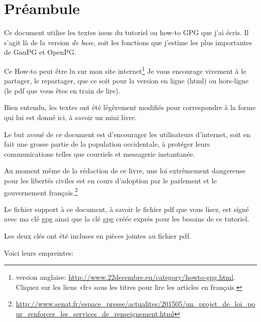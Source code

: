 \documentclass[10pt,a4paper,openany]{book}
\title{\huge\bsc{Des chiffres et des lettres}}
\author{Stéphane \bsc{22Decembre Guedon}}
\date{13 mai 2015}
\begin{document}
	\maketitle

	\chapter{Préambule}
	
	Ce document utilise les textes issus du tutoriel ou how-to GPG que j'ai écris. Il s'agit là de la version \textit{de base}, soit les fonctions que j'estime les plus importantes de GnuPG et OpenPG.
	
	Ce How-to peut être lu sur mon site internet\footnote{version anglaise: \url{http://www.22decembre.eu/category/howto-gpg.html}. Cliquez sur les liens «fr» sous les titres pour lire les articles en français.} Je vous encourage vivement à le partager, le repartager, que ce soit pour la version en ligne (html) ou hors-ligne (le pdf que vous êtes en train de lire).
	
	Bien entendu, les textes ont été légèrement modifiés pour correspondre à la forme qui lui est donné ici, à savoir un mini livre.
	
	Le but avoué de ce document est d'encourager les utilisateurs d'internet, soit en fait une grosse partie de la population occidentale, à protéger leurs communications telles que courriels et messagerie instantanée.
	
	Au moment même de la rédaction de ce livre, une loi extrêmement dangereuse pour les libertés 
	civiles est en cours d'adoption par le parlement et le gouvernement français.\footnote{\url{http://www.senat.fr/espace_presse/actualites/201505/un_projet_de_loi_pour_renforcer_les_services_de_renseignement.html}}
	
	Le fichier support à ce document, à savoir le fichier pdf que vous lisez, est signé avec ma clé gpg ainsi que la clé gpg créée exprès pour les besoins de ce tutoriel.
	
	Les deux clés ont été incluses en pièces jointes au fichier pdf.
	
	Voici leurs empreintes:
	
	\begin{center}
	\end{center}
	\begin{center}
	\end{center}
	
\end{document}
